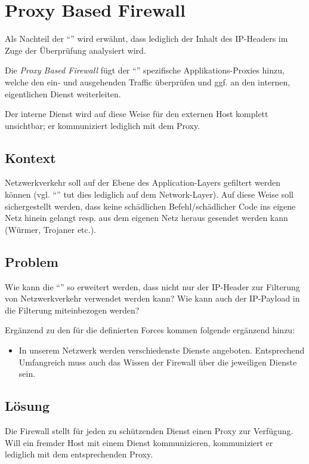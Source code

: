 \section{Proxy Based Firewall}
Als Nachteil der ``'' wird erwähnt, dass lediglich der Inhalt des IP-Headers im Zuge der Überprüfung analysiert wird.

Die \emph{Proxy Based Firewall} fügt der ``'' spezifische Applikations-Proxies hinzu, welche den ein- und ausgehenden Traffic überprüfen und ggf. an den internen, eigentlichen Dienst weiterleiten.

Der interne Dienst wird auf diese Weise für den externen Host  komplett unsichtbar; er kommuniziert lediglich mit dem Proxy.


\subsection*{Kontext}
Netzwerkverkehr soll auf der Ebene des Application-Layers gefiltert werden können (vgl. ``'' tut dies lediglich auf dem Network-Layer). Auf diese Weise soll sichergestellt werden, dass keine schädlichen Befehl/schädlicher Code ins eigene Netz hinein gelangt resp. aus dem eigenen Netz heraus gesendet werden kann (Würmer, Trojaner etc.).

\subsection*{Problem}
Wie kann die ``'' so erweitert werden, dass nicht nur der IP-Header zur Filterung von Netzwerkverkehr verwendet werden kann? Wie kann auch der IP-Payload in die Filterung miteinbezogen werden?

Ergänzend zu den für die  definierten Forces kommen folgende ergänzend hinzu:

\begin{itemize}
	\item In unserem Netzwerk werden verschiedenste Dienste angeboten. Entsprechend Umfangreich muss auch das Wissen der Firewall über die jeweiligen Dienste sein.
\end{itemize}


\subsection*{Lösung}
Die Firewall stellt für jeden zu schützenden Dienst einen Proxy zur Verfügung. Will ein fremder Host mit einem Dienst kommunizieren, kommuniziert er lediglich mit dem entsprechenden Proxy.

